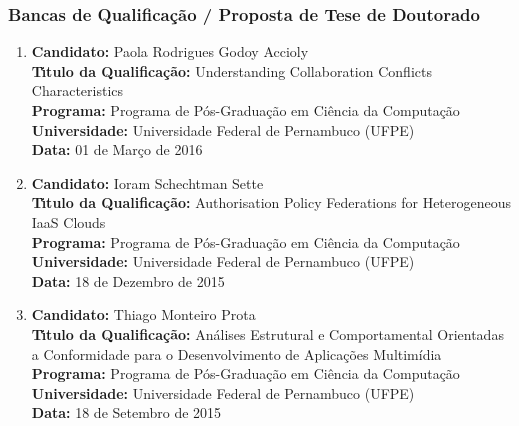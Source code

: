 \documentclass[a4paper,oneside,10pt]{article}
\begin{document}

\subsubsection{Bancas de Qualifica\c{c}\~ao / Proposta de Tese de Doutorado}
\vspace{0.3cm}

\begin{enumerate}
\renewcommand{\labelenumi}{{\large\bfseries\arabic{enumi}.}}
\vspace{0.3cm}

\item       \textbf{Candidato:} Paola Rodrigues Godoy Accioly \mbox{} \\
            \textbf{T\'{\i}tulo da Qualifica\c{c}\~{a}o:} Understanding Collaboration Conflicts Characteristics\\
            \textbf{Programa:} Programa de Pós-Graduação em Ciência da Computação\\
            \textbf{Universidade:} Universidade Federal de Pernambuco (UFPE)\\
            \textbf{Data:} 01 de Março de 2016

\item       \textbf{Candidato:} Ioram Schechtman Sette \mbox{} \\
            \textbf{T\'{\i}tulo da Qualifica\c{c}\~{a}o:} Authorisation Policy Federations for Heterogeneous IaaS Clouds\\
            \textbf{Programa:} Programa de Pós-Graduação em Ciência da Computação\\
            \textbf{Universidade:} Universidade Federal de Pernambuco (UFPE)\\
            \textbf{Data:} 18 de Dezembro de 2015

\item       \textbf{Candidato:} Thiago Monteiro Prota \mbox{} \\
            \textbf{T\'{\i}tulo da Qualifica\c{c}\~{a}o:} Análises Estrutural e Comportamental Orientadas a Conformidade para o Desenvolvimento de Aplicações Multimídia\\
            \textbf{Programa:} Programa de Pós-Graduação em Ciência da Computação\\
            \textbf{Universidade:} Universidade Federal de Pernambuco (UFPE)\\
            \textbf{Data:} 18 de Setembro de 2015


\end{enumerate}
\end{document}
